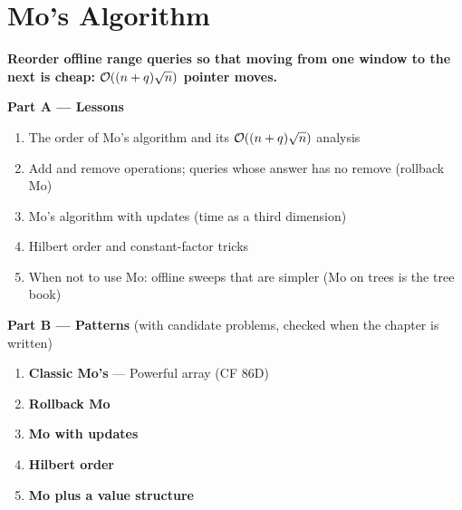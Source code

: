 \chapter{Mo's Algorithm}
\label{ch:mo}

\begin{tcolorbox}[enhanced, colback=white, colframe=secondaryblue, boxrule=1pt, arc=2mm]
\textbf{\large\textcolor{primaryblue}{Reorder offline range queries so that moving from one window to the next is cheap: $\mathcal{O}((n+q)\sqrt{n})$ pointer moves.}}
\end{tcolorbox}


\begin{plannedbox}
\textbf{Part A --- Lessons}
\begin{enumerate}[leftmargin=*, label=\textbf{A\arabic*.}, itemsep=1pt]
    \item The order of Mo's algorithm and its $\mathcal{O}((n+q)\sqrt n)$ analysis
    \item Add and remove operations; queries whose answer has no remove (rollback Mo)
    \item Mo's algorithm with updates (time as a third dimension)
    \item Hilbert order and constant-factor tricks
    \item When not to use Mo: offline sweeps that are simpler (Mo on trees is the tree book)
\end{enumerate}
\textbf{Part B --- Patterns} (with candidate problems, checked when the chapter is written)
\begin{enumerate}[leftmargin=*, label=\textbf{P\arabic*.}, itemsep=1pt]
    \item \textbf{Classic Mo's} --- Powerful array {\small\color{darkgray}(CF 86D)}
    \item \textbf{Rollback Mo}
    \item \textbf{Mo with updates}
    \item \textbf{Hilbert order}
    \item \textbf{Mo plus a value structure}
\end{enumerate}
\end{plannedbox}

